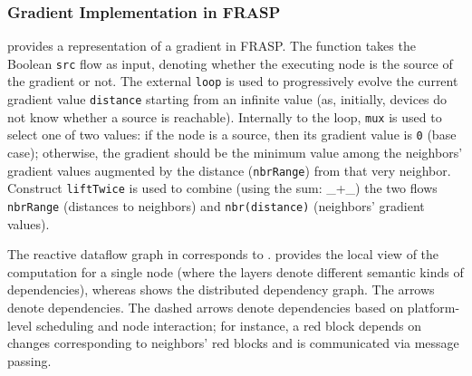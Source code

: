 \subsubsection{Gradient Implementation in FRASP}

 provides a representation of a gradient in FRASP. The function takes the Boolean \texttt{src} flow as input, denoting whether the executing node is the source of the gradient or not. The external \texttt{loop} is used to progressively evolve the current gradient value \texttt{distance} starting from an infinite value (as, initially, devices do not know whether a source is reachable). Internally to the loop, \texttt{mux} is used to select one of two values: if the node is a source, then its gradient value is \texttt{0} (base case); otherwise, the gradient should be the minimum value among the neighbors' gradient values augmented by the distance (\texttt{nbrRange}) from that very neighbor. Construct \texttt{liftTwice} is used to combine (using the sum: \_+\_) the two flows \texttt{nbrRange} (distances to neighbors) and \texttt{nbr(distance)} (neighbors' gradient values).



The reactive dataflow graph in  corresponds to .  provides the local view of the computation for a single node (where the layers denote different semantic kinds of dependencies), whereas  shows the distributed dependency graph. The arrows denote dependencies. The dashed arrows denote dependencies based on platform-level scheduling and node interaction; for instance, a red block depends on changes corresponding to neighbors' red blocks and is communicated via message passing.

